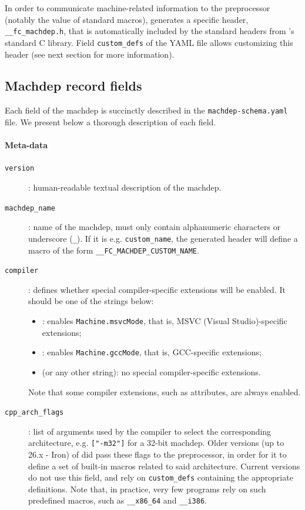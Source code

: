 In order to communicate machine-related information to the preprocessor (notably
the value of standard macros), \framac generates a specific header,
\verb+__fc_machdep.h+, that is automatically included by the standard headers from
\framac's standard C library. Field \verb+custom_defs+ of the YAML file allows
customizing this header (see next section for more information).

\subsection{Machdep record fields}\label{sec:machdep-fields}

Each field of the machdep is succinctly described in the
\verb+machdep-schema.yaml+ file.
We present below a thorough description of each field.

\paragraph{Meta-data}
\begin{description}
\item[\texttt{version}]: human-readable textual description of the machdep.
\item[\texttt{machdep\_name}]: name of the machdep, must only contain alphanumeric
  characters or underscore (\verb+_+). If it is e.g. \verb+custom_name+, the generated header will
  define a macro of the form \verb+__FC_MACHDEP_CUSTOM_NAME+.
\item[\texttt{compiler}]: defines whether special compiler-specific extensions
  will be enabled. It should be one of the strings below:
  \begin{itemize}
  \item[\texttt{msvc}]: enables \verb+Machine.msvcMode+, that is,
    MSVC (Visual Studio)-specific extensions;
  \item[\texttt{gcc}]: enables \verb+Machine.gccMode+, that is,
    GCC-specific extensions;
  \item[\texttt{generic}] (or any other string): no special
    compiler-specific extensions.
  \end{itemize}
  Note that some compiler extensions, such as attributes, are always enabled.
\item[\texttt{cpp\_arch\_flags}]: list of arguments used by the compiler to
  select the corresponding architecture, e.g. \verb+["-m32"]+ for a 32-bit
  machdep. Older versions (up to 26.x - Iron) of \framac did pass these flags to the preprocessor,
  in order for it to define a set of built-in macros related to said architecture.
  Current versions do not use this field, and rely on \texttt{\texttt{custom\_defs}}
  containing the appropriate definitions.
  Note that, in practice, very few programs rely on such predefined macros,
  such as \verb+__x86_64+ and \verb+__i386+.
\end{description}
